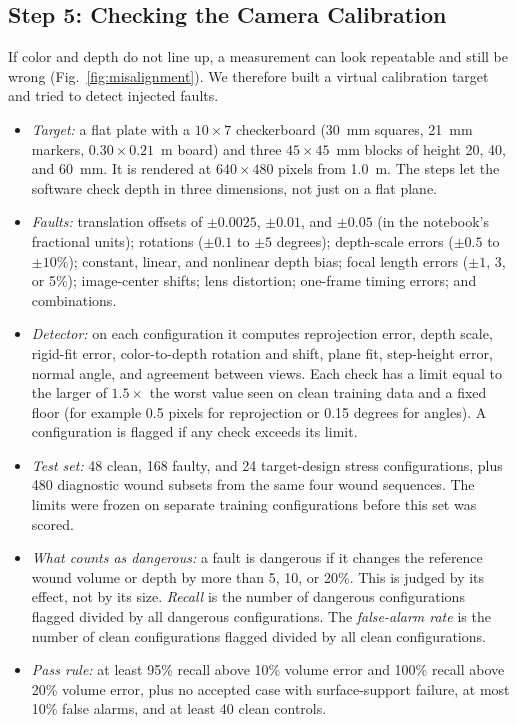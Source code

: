 \documentclass[conference]{IEEEtran}
\begin{document}
\subsection{Step 5: Checking the Camera Calibration}

If color and depth do not line up, a measurement can look repeatable and
still be wrong (Fig.~\ref{fig:misalignment}). We therefore built a virtual
calibration target and tried to detect injected faults.
\begin{itemize}
\item \emph{Target:} a flat plate with a $10\times7$ checkerboard (30~mm
squares, 21~mm markers, $0.30\times0.21$~m board) and three
$45\times45$~mm blocks of height 20, 40, and 60~mm. It is rendered at
$640\times480$ pixels from 1.0~m. The steps let the software check depth
in three dimensions, not just on a flat plane.
\item \emph{Faults:} translation offsets of $\pm0.0025$, $\pm0.01$, and
$\pm0.05$ (in the notebook's fractional units); rotations ($\pm0.1$ to $\pm5$ degrees); depth-scale errors
($\pm0.5$ to $\pm10\%$); constant, linear, and nonlinear depth bias; focal
length errors ($\pm1$, 3, or 5\%); image-center shifts; lens distortion;
one-frame timing errors; and combinations.
\item \emph{Detector:} on each configuration it computes reprojection
error, depth scale, rigid-fit error, color-to-depth rotation and shift,
plane fit, step-height error, normal angle, and agreement between views.
Each check has a limit equal to the larger of $1.5\times$ the worst value
seen on clean training data and a fixed floor (for example 0.5 pixels for
reprojection or 0.15 degrees for angles). A configuration is flagged if any
check exceeds its limit.
\item \emph{Test set:} 48 clean, 168 faulty, and 24 target-design stress
configurations, plus 480 diagnostic wound subsets from the same four wound
sequences. The limits were frozen on separate training configurations
before this set was scored.
\item \emph{What counts as dangerous:} a fault is dangerous if it changes
the reference wound volume or depth by more than 5, 10, or 20\%. This is
judged by its effect, not by its size. \emph{Recall} is the number of
dangerous configurations flagged divided by all dangerous configurations.
The \emph{false-alarm rate} is the number of clean configurations flagged
divided by all clean configurations.
\item \emph{Pass rule:} at least 95\% recall above 10\% volume error and
100\% recall above 20\% volume error, plus no accepted case with
surface-support failure, at most 10\% false alarms, and at least 40 clean
controls.
\end{itemize}
\end{document}
